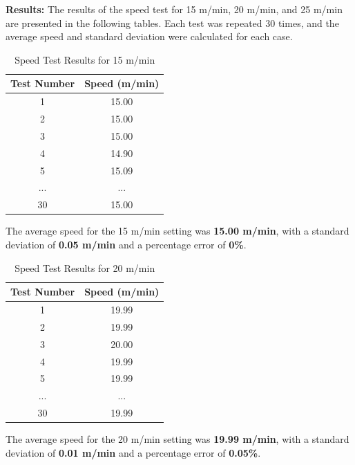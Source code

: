 \textbf{Results:}
The results of the speed test for 15 m/min, 20 m/min, and 25 m/min are presented in the following tables. Each test was repeated 30 times, and the average speed and standard deviation were calculated for each case.

\begin{table}[H]
\centering
\caption{Speed Test Results for 15 m/min}
\label{tab:speed_test_15}
\begin{tabular}{|c|c|}
\hline
\textbf{Test Number} & \textbf{Speed (m/min)} \\ \hline
1  & 15.00 \\ \hline
2  & 15.00 \\ \hline
3  & 15.00 \\ \hline
4  & 14.90 \\ \hline
5  & 15.09 \\ \hline
...  & ...  \\ \hline
30 & 15.00 \\ \hline
\end{tabular}
\end{table}

The average speed for the 15 m/min setting was \textbf{15.00 m/min}, with a standard deviation of \textbf{0.05 m/min} and a percentage error of \textbf{0\%}.

\begin{table}[H]
\centering
\caption{Speed Test Results for 20 m/min}
\label{tab:speed_test_20}
\begin{tabular}{|c|c|}
\hline
\textbf{Test Number} & \textbf{Speed (m/min)} \\ \hline
1  & 19.99 \\ \hline
2  & 19.99 \\ \hline
3  & 20.00 \\ \hline
4  & 19.99 \\ \hline
5  & 19.99 \\ \hline
...  & ...  \\ \hline
30 & 19.99 \\ \hline
\end{tabular}
\end{table}

The average speed for the 20 m/min setting was \textbf{19.99 m/min}, with a standard deviation of \textbf{0.01 m/min} and a percentage error of \textbf{0.05\%}.

